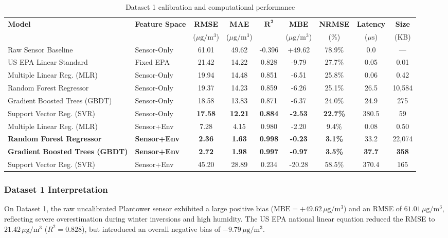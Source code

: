 \documentclass[11pt,a4paper]{article}
\begin{document}
\begin{table}[htbp]
\centering
\small
\caption{Dataset 1 calibration and computational performance}
\label{tab:results_d1}
\begin{tabularx}{\textwidth}{l l c c c c c c c}
\toprule
\textbf{Model} & \textbf{Feature Space} & \textbf{RMSE} & \textbf{MAE} & $\mathbf{R^2}$ & \textbf{MBE} & \textbf{NRMSE} & \textbf{Latency} & \textbf{Size} \\
& & ($\mu\text{g}/\text{m}^3$) & ($\mu\text{g}/\text{m}^3$) & & ($\mu\text{g}/\text{m}^3$) & (\%) & ($\mu\text{s}$) & (KB) \\
\midrule
Raw Sensor Baseline & Sensor-Only & 61.01 & 49.62 & -0.396 & +49.62 & 78.9\% & 0.0 & --- \\
US EPA Linear Standard & Fixed EPA & 21.42 & 14.22 & 0.828 & -9.79 & 27.7\% & 0.05 & 0.01 \\
Multiple Linear Reg. (MLR) & Sensor-Only & 19.94 & 14.48 & 0.851 & -6.51 & 25.8\% & 0.06 & 0.42 \\
Random Forest Regressor & Sensor-Only & 19.37 & 14.23 & 0.859 & -6.26 & 25.1\% & 26.5 & 10,584 \\
Gradient Boosted Trees (GBDT) & Sensor-Only & 18.58 & 13.83 & 0.871 & -6.37 & 24.0\% & 24.9 & 275 \\
Support Vector Reg. (SVR) & Sensor-Only & \textbf{17.58} & \textbf{12.21} & \textbf{0.884} & \textbf{-2.53} & \textbf{22.7\%} & 380.5 & 59 \\
\midrule
Multiple Linear Reg. (MLR) & Sensor+Env & 7.28 & 4.15 & 0.980 & -2.20 & 9.4\% & 0.08 & 0.50 \\
\textbf{Random Forest Regressor} & \textbf{Sensor+Env} & \textbf{2.36} & \textbf{1.63} & \textbf{0.998} & \textbf{-0.23} & \textbf{3.1\%} & 33.2 & 22,074 \\
\textbf{Gradient Boosted Trees (GBDT)} & \textbf{Sensor+Env} & \textbf{2.72} & \textbf{1.98} & \textbf{0.997} & \textbf{-0.97} & \textbf{3.5\%} & \textbf{37.7} & \textbf{358} \\
Support Vector Reg. (SVR) & Sensor+Env & 45.20 & 28.89 & 0.234 & -20.28 & 58.5\% & 370.4 & 165 \\
\bottomrule
\end{tabularx}
\end{table}

\subsubsection{Dataset 1 Interpretation}
On Dataset 1, the raw uncalibrated Plantower sensor exhibited a large positive bias ($\text{MBE} = +49.62\,\mu\text{g}/\text{m}^3$) and an RMSE of $61.01\,\mu\text{g}/\text{m}^3$, reflecting severe overestimation during winter inversions and high humidity. The US EPA national linear equation reduced the RMSE to $21.42\,\mu\text{g}/\text{m}^3$ ($R^2 = 0.828$), but introduced an overall negative bias of $-9.79\,\mu\text{g}/\text{m}^3$.
\end{document}
